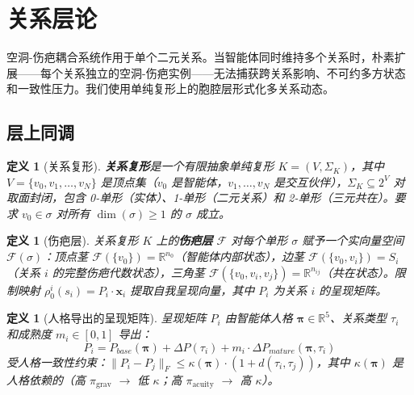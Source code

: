 \documentclass[11pt]{article}
\newtheorem{definition}[theorem]{定义}
\begin{document}
\section{关系层论}
\label{sec:sheaf}

空洞-伤疤耦合系统作用于单个二元关系。当智能体同时维持多个关系时，朴素扩展——每个关系独立的空洞-伤疤实例——无法捕获跨关系影响、不可约多方状态和一致性压力。我们使用单纯复形上的胞腔层形式化多关系动态。

\subsection{层上同调}

\begin{definition}[关系复形]
\label{def:relational-complex}
\textbf{关系复形}是一个有限抽象单纯复形 $K = (V, \Sigma_K)$，其中 $V = \{v_0, v_1, \ldots, v_N\}$ 是顶点集（$v_0$ 是智能体，$v_1, \ldots, v_N$ 是交互伙伴），$\Sigma_K \subseteq 2^V$ 对取面封闭，包含 0-单形（实体）、1-单形（二元关系）和 2-单形（三元共在）。要求 $v_0 \in \sigma$ 对所有 $\dim(\sigma) \geq 1$ 的 $\sigma$ 成立。
\end{definition}

\begin{definition}[伤疤层]
\label{def:scar-sheaf}
关系复形 $K$ 上的\textbf{伤疤层} $\mathcal{F}$ 对每个单形 $\sigma$ 赋予一个实向量空间 $\mathcal{F}(\sigma)$：顶点茎 $\mathcal{F}(\{v_0\}) = \mathbb{R}^{n_0}$（智能体内部状态），边茎 $\mathcal{F}(\{v_0, v_i\}) = S_i$（关系 $i$ 的完整伤疤代数状态），三角茎 $\mathcal{F}(\{v_0, v_i, v_j\}) = \mathbb{R}^{n_{ij}}$（共在状态）。限制映射 $\rho_0^i(s_i) = P_i \cdot \mathbf{x}_i$ 提取自我呈现向量，其中 $P_i$ 为关系 $i$ 的呈现矩阵。
\end{definition}

\begin{definition}[人格导出的呈现矩阵]
\label{def:presentation-matrices}
呈现矩阵 $P_i$ 由智能体人格 $\boldsymbol{\pi} \in \mathbb{R}^5$、关系类型 $\tau_i$ 和成熟度 $m_i \in [0,1]$ 导出：
\begin{equation}
P_i = P_{base}(\boldsymbol{\pi}) + \Delta P(\tau_i) + m_i \cdot \Delta P_{mature}(\boldsymbol{\pi}, \tau_i)
\end{equation}
受人格一致性约束：$\|P_i - P_j\|_F \leq \kappa(\boldsymbol{\pi}) \cdot (1 + d(\tau_i, \tau_j))$，其中 $\kappa(\boldsymbol{\pi})$ 是人格依赖的（高 $\pi_{\text{grav}}$ $\to$ 低 $\kappa$；高 $\pi_{\text{acuity}}$ $\to$ 高 $\kappa$）。
\end{definition}
\end{document}

